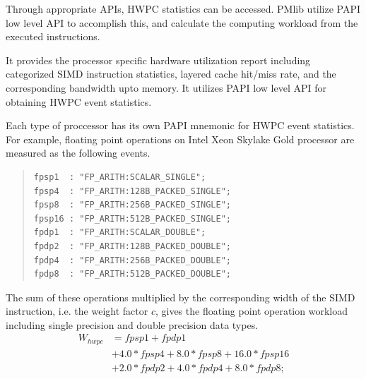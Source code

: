 \documentclass[conference]{IEEEtran}
\begin{document}
Through appropriate APIs, HWPC statistics can be accessed.
PMlib utilize PAPI \cite{papi-1} low level API to accomplish this,
and calculate the computing workload from the executed instructions.

It provides the processor specific hardware utilization report
including categorized SIMD instruction statistics,
layered cache hit/miss rate, and the corresponding bandwidth upto memory.
It utilizes PAPI low level API for obtaining HWPC event statistics.

Each type of proccessor has its own PAPI mnemonic for HWPC event statistics.
For example, floating point operations on
Intel Xeon Skylake Gold \cite{skylake-1} processor
are measured as the following events.


\begin{quote}
\begin{small}
\begin{verbatim}
fpsp1  : "FP_ARITH:SCALAR_SINGLE";
fpsp4  : "FP_ARITH:128B_PACKED_SINGLE";
fpsp8  : "FP_ARITH:256B_PACKED_SINGLE";
fpsp16 : "FP_ARITH:512B_PACKED_SINGLE";
fpdp1  : "FP_ARITH:SCALAR_DOUBLE";
fpdp2  : "FP_ARITH:128B_PACKED_DOUBLE";
fpdp4  : "FP_ARITH:256B_PACKED_DOUBLE";
fpdp8  : "FP_ARITH:512B_PACKED_DOUBLE";
\end{verbatim}
\end{small}
\end{quote}

The sum of these operations multiplied by the corresponding width
of the SIMD instruction, i.e. the weight factor $ c $, gives the
floating point operation workload including single precision
and double precision data types.
\begin{align}
	W_{hwpc} & = fpsp1 + fpdp1 \nonumber \\
			& + 4.0*fpsp4 + 8.0*fpsp8 + 16.0*fpsp16 \nonumber \\
			& + 2.0*fpdp2 + 4.0*fpdp4 + 8.0*fpdp8;
\end{align}
\end{document}
